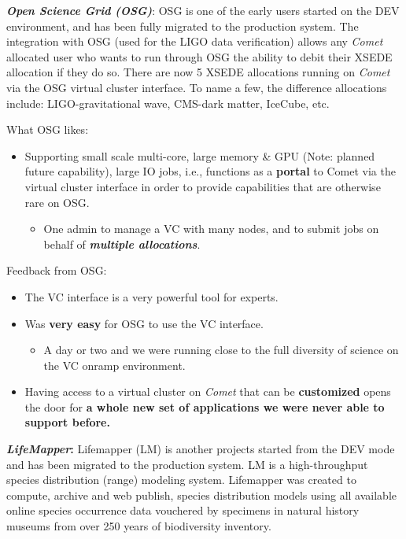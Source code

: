 \emph{\textbf{Open Science Grid (OSG)}}: OSG is one of the early users
started on the DEV environment, and has been fully migrated to the
production system. The integration with OSG (used for the LIGO data
verification) allows any \emph{Comet} allocated user who wants to run
through OSG the ability to debit their XSEDE allocation if they do so.
There are now 5 XSEDE allocations running on \emph{Comet} via the OSG
virtual cluster interface. To name a few, the difference allocations
include: LIGO-gravitational wave, CMS-dark matter, IceCube, etc.

What OSG likes:

\begin{itemize}
\item
  Supporting small scale multi-core, large memory \& GPU (Note: planned
  future capability), large IO jobs, i.e., functions as a
  \textbf{portal} to Comet via the virtual cluster interface in order to
  provide capabilities that are otherwise rare on OSG.

  \begin{itemize}
  \item
    One admin to manage a VC with many nodes, and to submit jobs on
    behalf of \emph{\textbf{multiple allocations}}.
  \end{itemize}
\end{itemize}

Feedback from OSG:

\begin{itemize}
\item
  The VC interface is a very powerful tool for experts.
\item
  Was \textbf{very easy} for OSG to use the VC interface.

  \begin{itemize}
  \item
    A day or two and we were running close to the full diversity of
    science on the VC onramp environment.
  \end{itemize}
\item
  Having access to a virtual cluster on \emph{Comet} that can be
  \textbf{customized} opens the door for \textbf{a whole new set of
  applications we were never able to support before.}
\end{itemize}

\textbf{\emph{LifeMapper}:} Lifemapper (LM) is another projects started
from the DEV mode and has been migrated to the production system. LM is
a high-throughput species distribution (range) modeling system.
Lifemapper was created to compute, archive and web publish, species
distribution models using all available online species occurrence data
vouchered by specimens in natural history museums from over 250 years of
biodiversity inventory.

